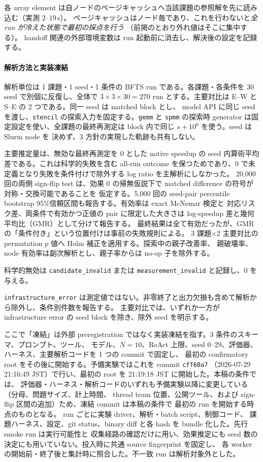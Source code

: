 \documentclass[conference,letterpaper]{IEEEtran}
\begin{document}
各 array element は自ノードのページキャッシュへ当該課題の参照解を先に読み込む（実測 $2$--$19$\,s）。
ページキャッシュはノード毎であり、これを行わないと\emph{全 run が冷えた状態で最初の採点を行う}
（前掲のとおり外れ値はそこに集中する）。
handoff 関連の外部環境変数は run 起動前に消去し、解決後の設定を記録する。

\paragraph{解析方法と実装凍結}
解析単位は 1 課題・1 seed・1 条件の BFTS run である。各課題・各条件を 30 seed で別個に反復し、全体で
$3\times3\times30=270$ run とする。主要対比は E--W と S--E の 2 つである。同一 seed は matched block とし、
model API に同じ seed を渡し、\texttt{stencil} の探索入力を固定する。\texttt{gemm} と \texttt{spmm} の探索時
generator は固定設定を使い、全課題の最終再測定は block 内で同じ $s+10^6$ を使う。seed は Slurm node を
決めず、3 方針の実現した軌跡も共有しない。

主要推定量は、無効な最終再測定を $0$ とした native speedup の seed 内算術平均差である。これは科学的失敗を含む
all-run outcome を保つためであり、0 で未定義となり失敗を条件付けで除外する log ratio を主解析にしなかった。
20,000 回の両側 sign-flip test は、効果 0 の帰無仮説下で matched difference の符号が対称・交換可能であることを
仮定する。5,000 回の seed-pair percentile bootstrap 95\%信頼区間も報告する。有効率は exact McNemar 検定と
対応リスク差、両条件で有効かつ正値の pair に限定した大きさは log-speedup 差と幾何平均比（GMR）として分けて報告する。
最終結果は全て有効だったが、GMR の「条件付き」という位置付けは事前の失敗規則による。
3 課題$\times$2 主要対比の permutation $p$ 値へ Holm 補正を適用する。探索中の親子改善率、
親破壊率、node 有効率は副次解析とし、親子率からは no-op 子を除外する。

科学的無効は \texttt{candidate\_invalid} または \texttt{measurement\_invalid} と記録し、$0$ を与える。

\texttt{infrastructure\_error} は測定値ではない。非零終了と出力欠損も含めて解析から除外し、条件別件数を報告する。
主要対比では、いずれか一方が infrastructure error の seed block を除き、除外 seed を明示する。

ここで「凍結」は外部 preregistration ではなく実装凍結を指す。3 条件のスキーマ、プロンプト、ツール、
モデル、$N=10$、ReAct 上限、seed 0--29、評価器、ハーネス、主要解析コードを 1 つの commit で固定し、
最初の confirmatory root をその後に開始する。予備実験ではこれを commit \texttt{cff60a7}
（2026-07-29 21:16:49 JST）で行い、最初の root を 21:19:18 JST に開始した。本稿の条件では、
評価器・ハーネス・解析コードのいずれも予備実験以降に変更している（分母、問題サイズ、計上時間、
thread team 位置、公開ツール、および sign-flip 区間の追加）ため、凍結 commit は本稿の条件で
最初の run を開始する時点のものとなる。
run ごとに実験 driver、解析・batch script、制御コード、
課題ハーネス、設定、git status、binary diff と各 hash を bundle 化した。先行 smoke run は実行可能性と
収集経路の確認だけに用い、効果推定にも seed 数の決定にも用いていない。投入時に共通 source fingerprint を固定し、
各 worker の開始前・終了後と集計時に照合した。不一致 run は解析対象外とした。
\end{document}
